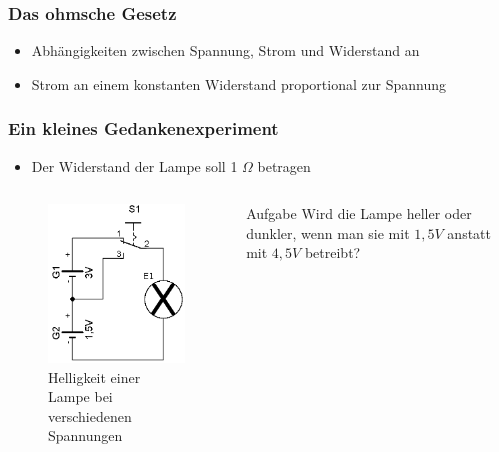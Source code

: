 \begin{frame}
  \frametitle{Das ohmsche Gesetz}
  \begin{itemize}
    \item Abhängigkeiten zwischen Spannung, Strom und Widerstand an
    \item Strom an einem konstanten Widerstand proportional zur Spannung
  \end{itemize}
\end{frame}

\begin{frame}
  \frametitle{Ein kleines Gedankenexperiment}
  \begin{itemize}
    \item Der Widerstand der Lampe soll 1 $\Omega$ betragen
  \end{itemize}
  \begin{columns}
    \begin{center}
      \begin{figure}
        \includegraphics[width=\textwidth,height=.6\textheight,keepaspectratio]{e03/Strom_Spannung_Abh.png}
        \caption{Helligkeit einer Lampe bei verschiedenen Spannungen}
      \end{figure}
    \end{center}
    \begin{exampleblock}{Aufgabe}
      Wird die Lampe heller oder dunkler, wenn man sie mit $1,5 V$ anstatt mit $4,5 V$ betreibt?
    \end{exampleblock}
  \end{columns}
\end{frame}

